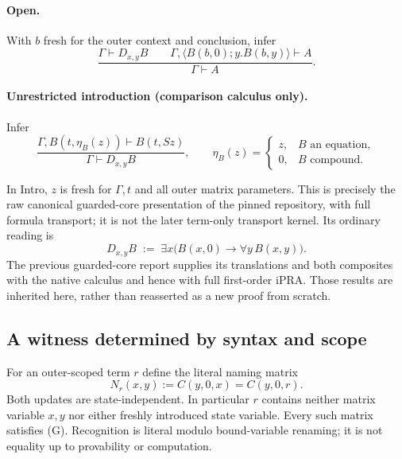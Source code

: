 \paragraph{Open.} With $b$ fresh for the outer context and conclusion, infer
\[
 \frac{\Gamma\vdash D_{x,y}B\qquad
       \Gamma,\langle B(b,0);y.B(b,y)\rangle\vdash A}
      {\Gamma\vdash A}.
\]
\paragraph{Unrestricted introduction (comparison calculus only).} Infer
\[
 \frac{\Gamma,B(t,\eta_B(z))\vdash B(t,Sz)}
      {\Gamma\vdash D_{x,y}B},\qquad
 \eta_B(z)=\begin{cases}z,&B\text{ an equation},\\0,&B\text{ compound}.\end{cases}
\]

In Intro, $z$ is fresh for $\Gamma,t$ and all outer matrix parameters.
This is precisely the raw canonical guarded-core presentation of the pinned
repository, with full formula transport; it is not the later term-only
transport kernel. Its ordinary reading is
\[
 D_{x,y}B\;:=\;\exists x\bigl(B(x,0)\to\forall y\,B(x,y)\bigr).
\]
The previous guarded-core report supplies its translations and both composites
with the native calculus and hence with full first-order iPRA. Those results
are inherited here, rather than reasserted as a new proof from scratch.

\subsection{A witness determined by syntax and scope}

For an outer-scoped term $r$ define the literal naming matrix
\[
 N_r(x,y):=C(y,0,x)=C(y,0,r).                            \tag{Name matrix}
\]
Both updates are state-independent. In particular $r$ contains neither
matrix variable $x,y$ nor either freshly introduced state variable. Every
such matrix satisfies (G). Recognition is literal modulo bound-variable
renaming; it is not equality up to provability or computation.

